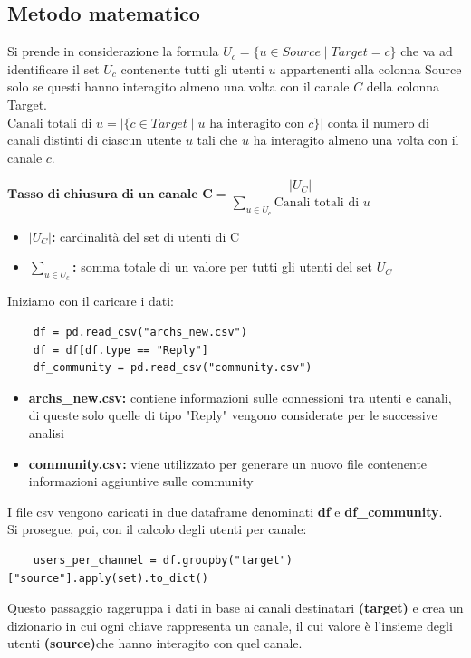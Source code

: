 \documentclass[12pt]{article}
\begin{document}
	\subsection{Metodo matematico}
	Si prende in considerazione la formula
	\textbf{\textbf{$U_{c} = \{u \in Source \mid Target = c\}$}} che va ad identificare il set $U_{c}$ contenente tutti gli utenti $u$ appartenenti alla colonna Source solo se questi hanno interagito almeno una volta con il canale $C$ della colonna Target.
	\\
	$\text{Canali totali di } u = |\{c \in Target \mid u \text{ ha interagito con } c\}|$ conta il numero di canali distinti di ciascun utente $u$ tali che $u$ ha interagito almeno una volta con il canale $c$.
	\\
	\begin{center}
		$\textbf{Tasso di chiusura di un canale C} = \dfrac{|U_{C}|}{\sum_{u \in U_{c}}  \text{Canali totali di } u}$
	\end{center}
	\begin{itemize}[label=]
		\item \textbf{$|U_{C}|$:} cardinalità del set di utenti di C
		\item \textbf{$\sum_{u \in U_{c}}$:} somma totale di un valore per tutti gli utenti del set $U_{C}$
	\end{itemize}
	Iniziamo con il caricare i dati:
	\begin{lstlisting}
	df = pd.read_csv("archs_new.csv")
	df = df[df.type == "Reply"]
	df_community = pd.read_csv("community.csv")
	\end{lstlisting}
	\begin{itemize}[label=]
		\item \textbf{archs\_new.csv:} contiene informazioni sulle connessioni tra utenti e canali, di queste solo quelle di tipo "Reply" vengono considerate per le successive analisi
		\item \textbf{community.csv:} viene utilizzato per generare un nuovo file contenente informazioni aggiuntive sulle community
	\end{itemize}
	I file csv vengono caricati in due dataframe denominati \textbf{df} e \textbf{df\_community}.\\
	Si prosegue, poi, con il calcolo degli utenti per canale:
	\begin{lstlisting}
	users_per_channel = df.groupby("target")["source"].apply(set).to_dict()
	\end{lstlisting}
	Questo passaggio raggruppa i dati in base ai canali destinatari \textbf{(target)} e crea un dizionario in cui ogni chiave rappresenta un canale, il cui valore è l'insieme degli utenti \textbf{(source)}che hanno interagito con quel canale.\\
\end{document}

